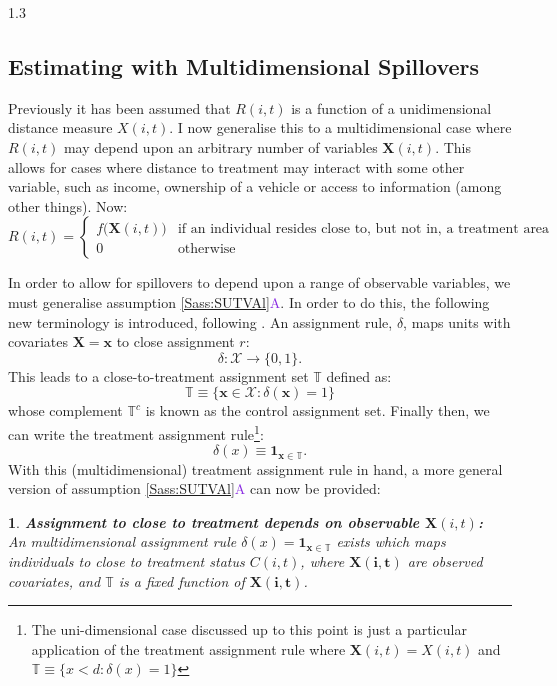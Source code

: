\documentclass[12pt]{article}
\makeatletter
\newtheorem*{assumption*}{\assumptionnumber}
\providecommand{\assumptionnumber}{}
\newenvironment{assumption}[2]
 {%
  \renewcommand{\assumptionnumber}{Assumption #1{#2}}%
  \begin{assumption*}%
  \protected@edef\@currentlabel{#1}%
 }
 {%
  \end{assumption*}
 }
\newcommand{\asref}[2]{\ref{#1}{\textcolor{BlueViolet}{#2}}}
\makeatother
\begin{document}
\begin{spacing}{1.3}

\subsection{Estimating with Multidimensional Spillovers}
\label{Ssscn:multi}
Previously it has been assumed that $R(i,t)$ is a function of a unidimensional 
distance measure $X(i,t)$. I now generalise this to a multidimensional case 
where $R(i,t)$ may depend upon an arbitrary number of variables 
$\mathbf{X}(i,t)$. This allows for cases where distance to treatment may 
interact with some other variable, such as income, ownership of a vehicle or
access to information (among other things). Now:
\begin{equation}
\nonumber
 R(i,t) =
  \begin{cases}
   f\Big(\mathbf{X}(i,t)\Big)   & \text{if an individual resides close to, but not in, a treatment area} \\
   0                            & \text{otherwise} 
  \end{cases}
\end{equation}

In order to allow for spillovers to depend upon a range of observable variables,
we must generalise assumption \asref{Sass:SUTVAl}{A}.  In order to do this, the
following new terminology is introduced, following \citet{Zajonc2012}. An 
assignment rule, $\delta$, maps units with covariates $\mathbf{X=x}$ to close
assignment $r$:
\[
\delta: \mathcal{X} \rightarrow \{0,1\}.
\]
This leads to a close-to-treatment assignment set $\mathbb{T}$ defined as:
\[
\mathbb{T}\equiv \{ \mathbf{x}\in\mathcal{X}: \delta(\mathbf{x})=1 \}
\]
whose complement $\mathbb{T}^c$ is known as the control assignment
set. Finally then, we can write the treatment assignment rule\footnote{The
uni-dimensional case discussed up to this point is just a particular application
of the treatment assignment rule where $\mathbf{X}(i,t)=X(i,t)$ and 
$\mathbb{T}\equiv \{ x<d: \delta(x)=1 \}$}:
\begin{equation}
\delta(x)\equiv \mathbf{1}_{\mathbf{x}\in\mathbb{T}}.
\end{equation}
With this (multidimensional) treatment assignment rule in hand, a more general 
version of assumption \asref{Sass:SUTVAl}{A} can now be provided:

\begin{assumption}{4}{B}
\label{Sass:SUTVAlM}
\textbf{Assignment to close to treatment depends on observable $\mathbf{X}(i,t)$:} \\ 
An multidimensional assignment rule $\delta(x)=\mathbf{1}_{\mathbf{x}\in \mathbb{T}}$ 
exists which maps individuals to close to treatment status $C(i,t)$, where 
$\mathbf{X(i,t)}$ are observed covariates, and $\mathbb{T}$ is a fixed 
function of $\mathbf{X(i,t)}$.
\end{assumption}


\end{spacing}
\end{document}
